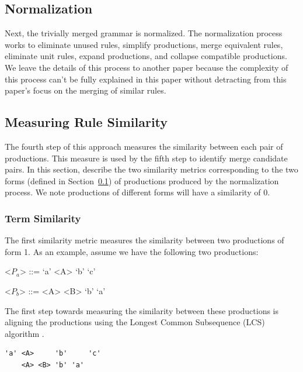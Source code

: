 \documentclass[conference]{IEEEtran}
\begin{document}
\hypertarget{sec:normalization}{%
\subsection{Normalization}\label{sec:normalization}}

Next, the trivially merged grammar is normalized. The normalization
process works to eliminate unused rules, simplify productions, merge
equivalent rules, eliminate unit rules, expand productions, and collapse
compatible productions. We leave the details of this process to another
paper because the complexity of this process can't be fully explained in
this paper without detracting from this paper's focus on the merging of
similar rules.

\hypertarget{sec:similarity}{%
\subsection{Measuring Rule Similarity}\label{sec:similarity}}

The fourth step of this approach measures the similarity between each
pair of productions. This measure is used by the fifth step to identify
merge candidate pairs. In this section, describe the two similarity
metrics corresponding to the two forms (defined in
Section~\ref{sec:normalization}) of productions produced by the
normalization process. We note productions of different forms will have
a similarity of 0.

\hypertarget{term-similarity}{%
\subsubsection{Term Similarity}\label{term-similarity}}

The first similarity metric measures the similarity between two
productions of form 1. As an example, assume we have the following two
productions:

\begin{grammar}
<$P_a$> ::= `a' <A> `b' `c'

<$P_b$> ::= <A> <B> `b' `a'

\end{grammar}

The first step towards measuring the similarity between these
productions is aligning the productions using the Longest Common
Subsequence (LCS) algorithm \cite{cormenIntroductionAlgorithms2001}.

\begin{verbatim}
'a' <A>     'b'     'c'
    <A> <B> 'b' 'a'
\end{verbatim}
\end{document}
